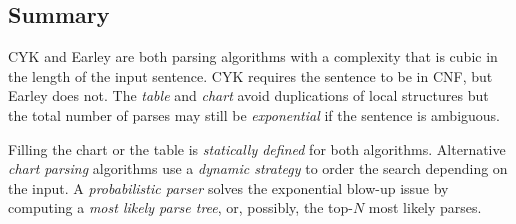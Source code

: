 \subsection{Summary}
CYK and Earley are both parsing algorithms with a complexity that is cubic in the length of the input sentence.
CYK requires the sentence to be in CNF, but Earley does not.
The \emph{table} and \emph{chart} avoid duplications of local structures but the total number of parses may still be \emph{exponential} if the sentence is ambiguous.

Filling the chart or the table is \emph{statically defined} for both algorithms.
Alternative \emph{chart parsing} algorithms use a \emph{dynamic strategy} to order the search depending on the input.
A \emph{probabilistic parser} solves the exponential blow-up issue by computing a \emph{most likely parse tree}, or, possibly, the top-\(N\) most likely parses.
